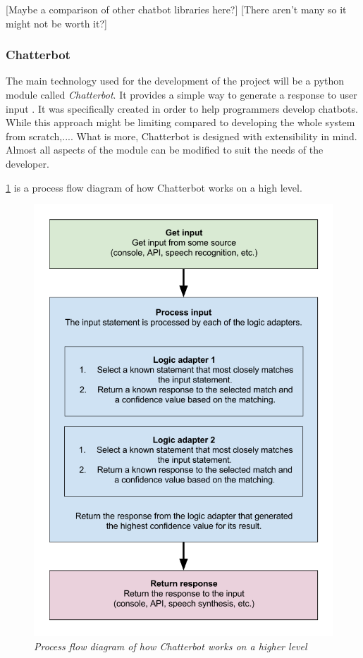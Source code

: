 \documentclass[12pt,a4paper]{article}
\newcommand{\captionstyle}[1] {
    \small{\textit{#1}}
}
\begin{document}
[Maybe a comparison of other chatbot libraries here?]
[There aren't many so it might not be worth it?]

\subsubsection{Chatterbot}
The main technology used for the development of the project will be a python module called \textit{Chatterbot}. It provides a simple way to generate a response to user input \cite{Chatterbot:online}. It was specifically created in order to help programmers develop chatbots. While this approach might be limiting compared to developing the whole system from scratch,.... What is more, Chatterbot is designed with extensibility in mind. Almost all aspects of the module can be modified to suit the needs of the developer.

\cref{fig:chatterbot-process-flow} is a process flow diagram of how Chatterbot works on a high level.

\begin{figure}[!htb]%
    \centering
    \includegraphics[width=0.8\columnwidth]{chatterbot-process-flow}%
    \caption{\captionstyle{Process flow diagram of how Chatterbot works on a higher level \cite{Chatterbot:online}}}%
    \label{fig:chatterbot-process-flow}%
\end{figure}
\end{document}
